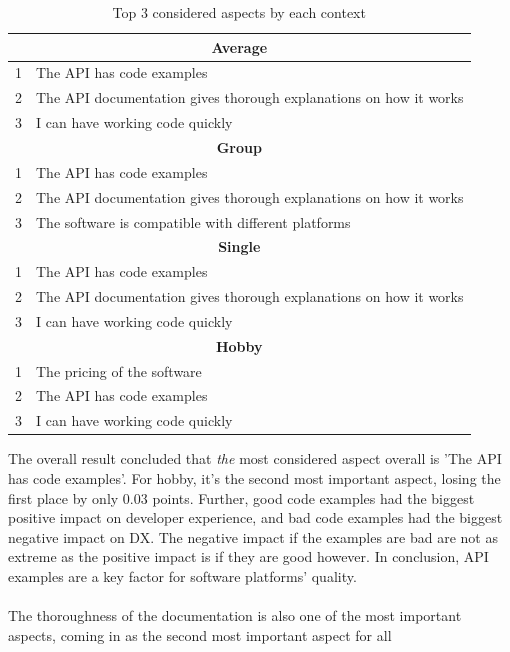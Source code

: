\documentclass{article}
\begin{document}
\begin{table}[H]
\centering
\begin{tabular}{r l}
\hline\hline
\multicolumn{2}{c}{\textbf{Average}} \\ \hline
1 &The API has code examples \\
2 & The API documentation gives thorough explanations on how it works \\
3 &I can have working code quickly \\
\hline\hline
\multicolumn{2}{c}{\textbf{Group}} \\ \hline
1 & The API has code examples                                        \\
2 & The API documentation gives thorough explanations on how it works \\
3 & The software is compatible with different platforms              \\
\hline\hline
\multicolumn{2}{c}{\textbf{Single}} \\ \hline
1 &  The API has code examples                                         \\
2 &  The API documentation gives thorough explanations on how it works  \\
3 &  I can have working code quickly                                   \\
\hline\hline
\multicolumn{2}{c}{\textbf{Hobby}} \\ \hline
1 & The pricing of the software    \\
2 & The API has code examples       \\
3 & I can have working code quickly\\ \hline
\end{tabular}
\caption{Top 3 considered aspects by each context}
\label{tabl:top3}
\end{table}
The overall result concluded that \textit{the} most considered aspect overall
is 'The API has code examples'. For hobby, it's the second most
important aspect, losing the first place by only 0.03 points.
Further, good code
examples had the biggest positive impact on developer experience, and
bad code examples had the biggest negative impact on DX. The negative
impact if the examples are bad are not as extreme as the positive impact
is if they are good however. In conclusion, API examples are a key
factor for software platforms' quality.
\\ \\
The thoroughness of the documentation is also one of the most important
aspects, coming in as the second most important aspect for all
\end{document}
